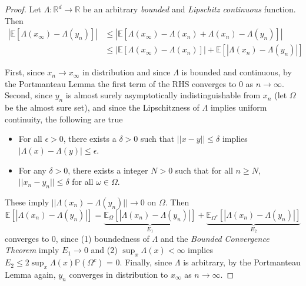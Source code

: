 \documentclass{article}
\def\sP{{\mathbb{P}}}
\newcommand{\E}{\mathbb{E}}
\newcommand{\R}{\mathbb{R}}
\begin{document}
\begin{proof}
Let $\Lambda:\R^d\rightarrow\R$ be an arbitrary \emph{bounded} and \emph{Lipschitz continuous} function. 
Then 
\begin{align*}
\left|\E\left[\Lambda\left(x_{\infty}\right)-\Lambda\left(y_n\right)\right]\right|
&\leq 
\left|\E\left[\Lambda\left(x_{\infty}\right) -
\Lambda(x_n) +
\Lambda(x_n) -
\Lambda\left(y_n\right)\right]\right| \\
&\leq
\left|\E\left[\Lambda\left(x_{\infty}\right) -
\Lambda(x_n)\right]\right|
+
\E\left[\left|\Lambda\left(x_{n}\right)-\Lambda\left(y_n\right)\right|\right] 
\end{align*}

First, since $x_n\rightarrow x_\infty$ in distribution and since $\Lambda$ is bounded and continuous, by the Portmanteau Lemma the first term of the RHS converges to $0$ as $n\rightarrow\infty$. 
Second,
since $y_n$ is almost surely asymptotically indistinguishable from $x_n$ (let $\Omega$ be the almost sure set),
and since the Lipschitzness of $\Lambda$ implies uniform continuity, the following are true
\begin{itemize}
    \item For all $\epsilon>0$, there exists a $\delta>0$ such that $||x-y||\leq \delta$ implies $|\Lambda(x)-\Lambda(y)|\leq \epsilon$.
    \item For any $\delta>0$, there exists a integer $N>0$ such that for all $n\geq N$, $||x_n-y_n||\leq \delta$ for all $\omega\in\Omega$. 
\end{itemize}
These imply $||\Lambda(x_n)-\Lambda(y_n)||\rightarrow0$ on $\Omega$.
Then
$$\E\left[\left|\Lambda\left(x_{n}\right)-\Lambda\left(y_n\right)\right|\right]=
\underbrace{\E_{\Omega}\left[\left|\Lambda\left(x_{n}\right)-\Lambda\left(y_n\right)\right|\right]}_{E_1}+
\underbrace{\E_{\Omega^c}\left[\left|\Lambda\left(x_{n}\right)-\Lambda\left(y_n\right)\right|\right]}_{E_2}$$
converges to $0$, since (1)
boundedness of $\Lambda$ and the \emph{Bounded Convergence Theorem} imply $E_1\rightarrow0$ and (2) $\sup_{x}\Lambda(x)<\infty$ implies $E_2\leq 2\sup_{x}\Lambda(x) \sP(\Omega^c)$ = 0. 
Finally, since $\Lambda$ is arbitrary,
by the Portmanteau Lemma again, $y_n$ converges in distribution to $x_\infty$ as $n\rightarrow\infty$. 
\end{proof}
\end{document}
